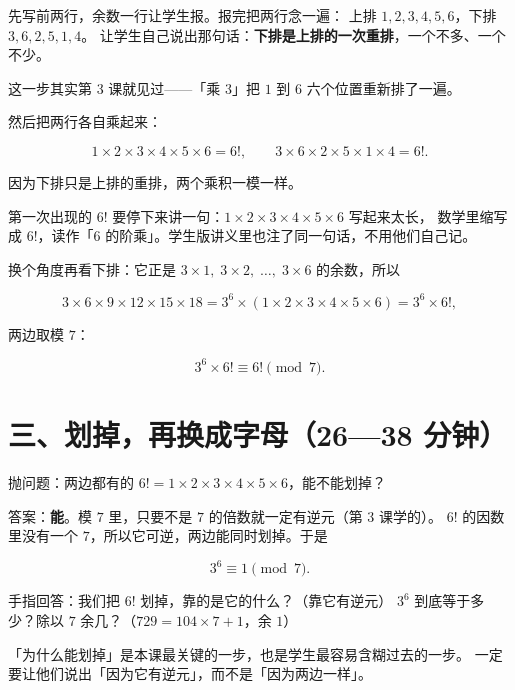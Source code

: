 \begin{caozuo}
  先写前两行，余数一行让学生报。报完把两行念一遍：
  上排 \(1,2,3,4,5,6\)，下排 \(3,6,2,5,1,4\)。
  让学生自己说出那句话：\textbf{下排是上排的一次重排}，一个不多、一个不少。
\end{caozuo}

这一步其实第 3 课就见过——「乘 \(3\)」把 \(1\) 到 \(6\) 六个位置重新排了一遍。

然后把两行各自乘起来：

\[
  1\times2\times3\times4\times5\times6=6!, \qquad
  3\times6\times2\times5\times1\times4=6! .
\]

因为下排只是上排的重排，两个乘积一模一样。

\begin{zhu}
  第一次出现的 \(6!\) 要停下来讲一句：\(1\times2\times3\times4\times5\times6\) 写起来太长，
  数学里缩写成 \(6!\)，读作「\(6\) 的阶乘」。学生版讲义里也注了同一句话，不用他们自己记。
\end{zhu}

换个角度再看下排：它正是 \(3\times1,\;3\times2,\;\dots,\;3\times6\) 的余数，所以

\[
  3\times6\times9\times12\times15\times18
  =3^{6}\times(1\times2\times3\times4\times5\times6)
  =3^{6}\times6! ,
\]

两边取模 \(7\)：

\[
  3^{6}\times6!\equiv6!\pmod 7 .
\]

\section*{三、划掉，再换成字母（26—38 分钟）}

抛问题：两边都有的 \(6!=1\times2\times3\times4\times5\times6\)，能不能划掉？

答案：\textbf{能}。模 \(7\) 里，只要不是 \(7\) 的倍数就一定有逆元（第 3 课学的）。
\(6!\) 的因数里没有一个 \(7\)，所以它可逆，两边能同时划掉。于是

\[
  3^{6}\equiv1\pmod 7 .
\]

\begin{caozuo}
  手指回答：我们把 \(6!\) 划掉，靠的是它的什么？（靠它有逆元）
  \(3^6\) 到底等于多少？除以 \(7\) 余几？（\(729=104\times7+1\)，余 \(1\)）
\end{caozuo}

\begin{zhu}
  「为什么能划掉」是本课最关键的一步，也是学生最容易含糊过去的一步。
  一定要让他们说出「因为它有逆元」，而不是「因为两边一样」。
\end{zhu}

